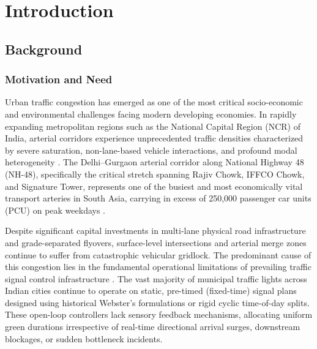 \chapter{Introduction}
\label{ch:intro}

\section{Background}
\label{sec:background}

\subsection{Motivation and Need}
Urban traffic congestion has emerged as one of the most critical socio-economic and environmental challenges facing modern developing economies. In rapidly expanding metropolitan regions such as the National Capital Region (NCR) of India, arterial corridors experience unprecedented traffic densities characterized by severe saturation, non-lane-based vehicle interactions, and profound modal heterogeneity \cite{ref_tomtom2023, ref_irc106}. The Delhi--Gurgaon arterial corridor along National Highway 48 (NH-48), specifically the critical stretch spanning Rajiv Chowk, IFFCO Chowk, and Signature Tower, represents one of the busiest and most economically vital transport arteries in South Asia, carrying in excess of 250,000 passenger car units (PCU) on peak weekdays \cite{ref_delhidataset}. 

Despite significant capital investments in multi-lane physical road infrastructure and grade-separated flyovers, surface-level intersections and arterial merge zones continue to suffer from catastrophic vehicular gridlock. The predominant cause of this congestion lies in the fundamental operational limitations of prevailing traffic signal control infrastructure \cite{ref_roess2010}. The vast majority of municipal traffic lights across Indian cities continue to operate on static, pre-timed (fixed-time) signal plans designed using historical Webster's formulations or rigid cyclic time-of-day splits. These open-loop controllers lack sensory feedback mechanisms, allocating uniform green durations irrespective of real-time directional arrival surges, downstream blockages, or sudden bottleneck incidents. 

